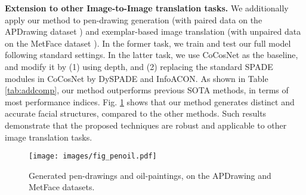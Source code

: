 \documentclass[10pt,twocolumn,letterpaper]{article}
\begin{document}
\textbf{Extension to other Image-to-Image translation tasks.} 
We additionally apply our method to pen-drawing generation  (with paired data on the APDrawing dataset \cite{YiLLR19}) and exemplar-based image translation (with unpaired data on the MetFace dataset \cite{karras2020training}). 
In the former task, we train and test our full model following standard settings. In the latter task, we use CoCosNet \cite{cocosnet} as the baseline, and modify it by (1) using depth, and (2) replacing the standard SPADE modules in CoCosNet by DySPADE and InfoACON. As shown in Table \ref{tab:addcomp}, our method outperforms previous SOTA methods, in terms of most performance indices. Fig. \ref{fig:metface} shows that our method generates distinct and accurate facial structures, compared to the other methods. Such results demonstrate that the proposed techniques are robust and applicable to other image translation tasks. 


\begin{figure}
	\centering
	\texttt{[image: images/fig\_penoil.pdf]}
	\caption{Generated pen-drawings and oil-paintings, on the APDrawing and MetFace datasets.}
	\label{fig:metface}
\end{figure}
\end{document}
